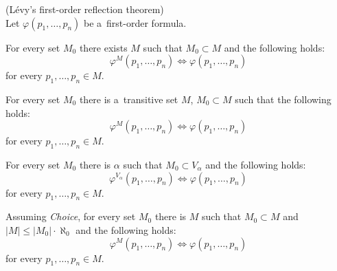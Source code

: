 \begin{theorem}{(Lévy's first-order reflection theorem)}\label{theorem:first_order_reflection}\\
Let $\varphi(p_1, \ldots, p_n)$ be a~first-order formula.
\bce[(i)]
\item For every set $M_0$ there exists $M$ such that $M_0 \subset M$ and the following holds:
\begin{equation}
\varphi^M(p_1, \ldots, p_n) \iff \varphi(p_1, \ldots, p_n)\label{equation:levy_theorem_i}
\end{equation}
for every $p_1, \ldots, p_n \in M$.

\item For every set $M_0$  there is a~transitive set $M$, $M_0 \subset M$ such that the following holds:
\begin{equation}
\varphi^M(p_1, \ldots, p_n) \iff \varphi(p_1, \ldots, p_n)
\end{equation}
for every $p_1, \ldots, p_n \in M$.

\item For every set $M_0$ there is $\alpha$ such that $M_0 \subset V_{\alpha}$ and the following holds:
\begin{equation}
\varphi^{V_{\alpha}}(p_1, \ldots, p_n) \iff \varphi(p_1, \ldots, p_n)
\end{equation}
for every $p_1, \ldots, p_n \in M$.

\item Assuming \emph{Choice}, for every set $M_0$ there is $M$ such that $M_0 \subset M$ and $|M| \leq |M_0| \cdot \aleph_0$ and the following holds:
\begin{equation}
\varphi^M(p_1, \ldots, p_n) \iff \varphi(p_1, \ldots, p_n)
\end{equation}
for every $p_1, \ldots, p_n \in M$.
\ece
\end{theorem}


